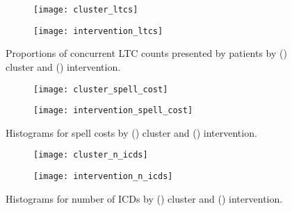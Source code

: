 \begin{figure}
    \centering
    \begin{subfigure}{\halfimgwidth}
        \texttt{[image: cluster\_ltcs]}
        \caption{}\label{fig:cluster_ltcs}
    \end{subfigure}\hfill%
    \begin{subfigure}{\halfimgwidth}
        \texttt{[image: intervention\_ltcs]}
        \caption{}\label{fig:intervention_ltcs}
    \end{subfigure}
    \caption{%
        Proportions of concurrent LTC counts presented by patients by
        () cluster and ()
        intervention.
    }\label{fig:ltcs}
\end{figure}

\begin{figure}
    \centering
    \begin{subfigure}{\halfimgwidth}
        \texttt{[image: cluster\_spell\_cost]}
        \caption{}\label{fig:cluster_spell_cost}
    \end{subfigure}\hfill%
    \begin{subfigure}{\halfimgwidth}
        \texttt{[image: intervention\_spell\_cost]}
        \caption{}\label{fig:intervention_spell_cost}
    \end{subfigure}
    \caption{%
        Histograms for spell costs by () cluster
        and () intervention.
    }\label{fig:wimd_hist}
\end{figure}

\begin{figure}
    \centering
    \begin{subfigure}{\halfimgwidth}
        \texttt{[image: cluster\_n\_icds]}
        \caption{}\label{fig:cluster_n_icds}
    \end{subfigure}\hfill%
    \begin{subfigure}{\halfimgwidth}
        \texttt{[image: intervention\_n\_icds]}
        \caption{}\label{fig:intervention_n_icds}
    \end{subfigure}
    \caption{%
        Histograms for number of ICDs by () cluster
        and () intervention.
    }\label{fig:n_icds_hist}
\end{figure}

